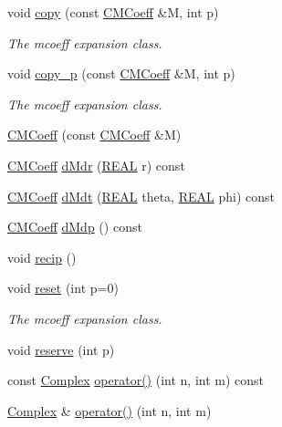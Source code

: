 \begin{DoxyCompactItemize}
\item 
void \hyperlink{classCMCoeff_a7010837883b56f9b972888bffb6fbb3d}{copy} (const \hyperlink{classCMCoeff}{C\-M\-Coeff} \&M, int p)
\begin{DoxyCompactList}\small\item\em The mcoeff expansion class. \end{DoxyCompactList}\item 
void \hyperlink{classCMCoeff_aba7b82a12360b0789af87a8dda74863b}{copy\-\_\-p} (const \hyperlink{classCMCoeff}{C\-M\-Coeff} \&M, int p)
\begin{DoxyCompactList}\small\item\em The mcoeff expansion class. \end{DoxyCompactList}\item 
\hyperlink{classCMCoeff_ae5a7fcbb8f989dbbff71d79738fd9356}{C\-M\-Coeff} (const \hyperlink{classCMCoeff}{C\-M\-Coeff} \&M)
\item 
\hyperlink{classCMCoeff}{C\-M\-Coeff} \hyperlink{classCMCoeff_aab926cdd2ef1a0f188f82603108296a8}{d\-Mdr} (\hyperlink{util_8h_a5821460e95a0800cf9f24c38915cbbde}{R\-E\-A\-L} r) const 
\item 
\hyperlink{classCMCoeff}{C\-M\-Coeff} \hyperlink{classCMCoeff_a2e9e6517ed48d1758af058f95b5af50c}{d\-Mdt} (\hyperlink{util_8h_a5821460e95a0800cf9f24c38915cbbde}{R\-E\-A\-L} theta, \hyperlink{util_8h_a5821460e95a0800cf9f24c38915cbbde}{R\-E\-A\-L} phi) const 
\item 
\hyperlink{classCMCoeff}{C\-M\-Coeff} \hyperlink{classCMCoeff_a3457ae837d9f8d250757fae3fd69c441}{d\-Mdp} () const 
\item 
void \hyperlink{classCMCoeff_a6e7e750022bf6a6f32dff9092881647c}{recip} ()
\item 
void \hyperlink{classCMCoeff_a5fc4a2ee0ab437bd601fd67ccc5bd43b}{reset} (int p=0)
\begin{DoxyCompactList}\small\item\em The mcoeff expansion class. \end{DoxyCompactList}\item 
void \hyperlink{classCMCoeff_a10d5db85d700255768d091c10fda818c}{reserve} (int p)
\item 
const \hyperlink{util_8h_a0ef19d29521fc1e3356ea268ba175cfc}{Complex} \hyperlink{classCMCoeff_a8776dd638fca3d95f813acb93c7896c7}{operator()} (int n, int m) const 
\item 
\hyperlink{util_8h_a0ef19d29521fc1e3356ea268ba175cfc}{Complex} \& \hyperlink{classCMCoeff_ad6668675df0fa31437bebee2a2b00e0f}{operator()} (int n, int m)

\end{DoxyCompactItemize}
